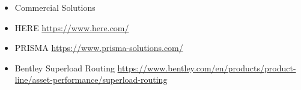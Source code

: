 \begin{itemize}





\item Commercial Solutions

\item HERE
\url{https://www.here.com/}
\item PRISMA
\url{https://www.prisma-solutions.com/}

\item Bentley Superload Routing
\url{https://www.bentley.com/en/products/product-line/asset-performance/superload-routing}

\end{itemize}
